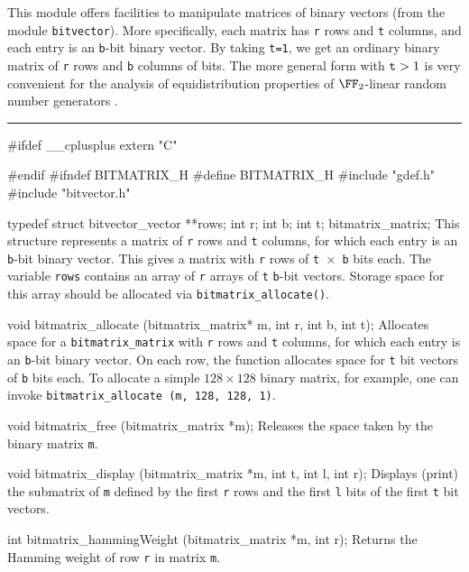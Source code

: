 
This module offers facilities to manipulate matrices of binary vectors
(from the module \texttt{bitvector}).
More specifically, each matrix has {\tt r} rows and {\tt t} columns,
and each entry is an {\tt b}-bit binary vector.
By taking {\tt t=1}, we get an ordinary binary matrix of {\tt r} rows and
{\tt b} columns of bits.
The more general form with ${\tt t} > 1$ is very convenient for the analysis of
equidistribution properties of $\FF_2$-linear random number generators
\cite{rLEC05a,rLEC09a,rPAN04t}.

\bigskip\hrule

\code\hide
#ifdef __cplusplus
extern "C" {
#endif
#ifndef BITMATRIX_H
#define BITMATRIX_H
\endhide
#include "gdef.h"
#include "bitvector.h"
\endcode

\code

typedef struct{
  bitvector_vector **rows;
  int r;
  int b;
  int t;
} bitmatrix_matrix;
\endcode
 \tab
This structure represents a matrix of {\tt r} rows and {\tt t} columns,
for which each entry is an {\tt b}-bit binary vector.
This gives a matrix with {\tt r} rows of {\tt t $\times$ b} bits each.
The variable {\tt rows} contains an array of {\tt r} arrays of {\tt t} {\tt b}-bit vectors.
Storage space for this array should be allocated via {\tt bitmatrix\_allocate()}.
\endtab
\code

void bitmatrix_allocate (bitmatrix_matrix* m, int r, int b, int t);
\endcode
\tab
Allocates space for a {\tt bitmatrix\_matrix} with {\tt r} rows and {\tt t} columns,
for which each entry is an {\tt b}-bit binary vector.
On each row, the function allocates space for {\tt t} bit vectors of {\tt b} bits each.
To allocate a simple $128 \times 128$ binary matrix, for example, one can invoke
{\tt bitmatrix\_allocate (m, 128, 128, 1)}.
\endtab
\code

void bitmatrix_free (bitmatrix_matrix *m);
\endcode
 \tab
 Releases the space taken by the binary matrix {\tt m}.
 \endtab
\code

void bitmatrix_display (bitmatrix_matrix *m, int t, int l, int r);
\endcode
 \tab
Displays (print) the submatrix of {\tt *m} defined by the first {\tt r} rows and the
first {\tt l} bits of the first {\tt t} bit vectors.
 \endtab
 \code

int bitmatrix_hammingWeight (bitmatrix_matrix *m, int r);
\endcode
 \tab
 Returns the Hamming weight of row {\tt r} in matrix {\tt *m}.
 \endtab
 \code

}
